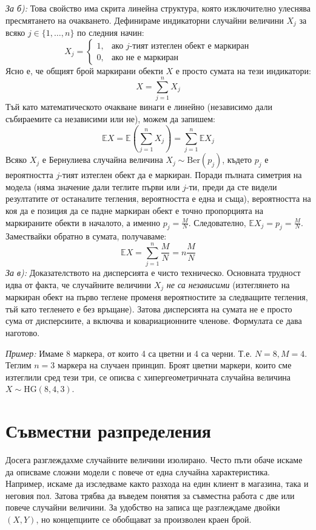 \documentclass{article}
\begin{document}
\textit{За б):} Това свойство има скрита линейна структура, която изключително улеснява пресмятането на очакването. Дефинираме индикаторни случайни величини $X_j$ за всяко $j \in \{1, \dots, n\}$ по следния начин:
\[
X_j = \begin{cases} 
1, & \text{ако } j\text{-тият изтеглен обект е маркиран} \\ 
0, & \text{ако не е маркиран} 
\end{cases}
\]
Ясно е, че общият брой маркирани обекти $X$ е просто сумата на тези индикатори:
\[
X = \sum_{j=1}^n X_j
\]
Тъй като математическото очакване винаги е линейно (независимо дали събираемите са независими или не), можем да запишем:
\[
\mathbb{E}X = \mathbb{E}\left(\sum_{j=1}^n X_j\right) = \sum_{j=1}^n \mathbb{E}X_j
\]
Всяко $X_j$ е Бернулиева случайна величина $X_j \sim \text{Ber}(p_j)$, където $p_j$ е вероятността $j$-тият изтеглен обект да е маркиран. Поради пълната симетрия на модела (няма значение дали теглите първи или $j$-ти, преди да сте видели резултатите от останалите тегления, вероятността е една и съща), вероятността на коя да е позиция да се падне маркиран обект е точно пропорцията на маркираните обекти в началото, а именно $p_j = \frac{M}{N}$.
Следователно, $\mathbb{E}X_j = p_j = \frac{M}{N}$. Замествайки обратно в сумата, получаваме:
\[
\mathbb{E}X = \sum_{j=1}^n \frac{M}{N} = n \frac{M}{N}
\]
\textit{За в):} Доказателството на дисперсията е чисто техническо. Основната трудност идва от факта, че случайните величини $X_j$ \textit{не са независими} (изтеглянето на маркиран обект на първо теглене променя вероятностите за следващите тегления, тъй като тегленето е без връщане). Затова дисперсията на сумата не е просто сума от дисперсиите, а включва и ковариационните членове. Формулата се дава наготово.

\textit{Пример:} Имаме 8 маркера, от които 4 са цветни и 4 са черни. Т.е. $N = 8, M = 4$. Теглим $n = 3$ маркера на случаен принцип. Броят цветни маркери, които сме изтеглили сред тези три, се описва с хипергеометричната случайна величина $X \sim \text{HG}(8, 4, 3)$. 


\section{Съвместни разпределения}

Досега разглеждахме случайните величини изолирано. Често пъти обаче искаме да описваме сложни модели с повече от една случайна характеристика. Например, искаме да изследваме както разхода на един клиент в магазина, така и неговия пол. Затова трябва да въведем понятия за съвместна работа с две или повече случайни величини. За удобство на записа ще разглеждаме двойки $(X, Y)$, но концепциите се обобщават за произволен краен брой.
\end{document}
